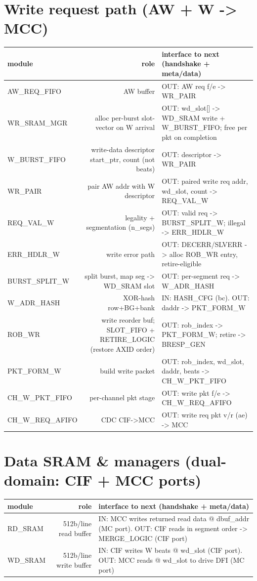 \documentclass[9pt]{extarticle}
\newenvironment{flow}{%
  \footnotesize\rowcolors{2}{white}{zeb}\begin{longtable}{M R I}
  \rowcolor{hb}\textbf{module} & \textbf{role} & \textbf{interface to next (handshake + meta/data)}\\ \midrule\endhead}
  {\bottomrule\end{longtable}}
\begin{document}
\section{Write request path  \textcolor{headbg}{(AW + W -> MCC)}}
\begin{flow}
AW_REQ_FIFO & AW buffer & OUT: AW req  f/e -> WR_PAIR\\
WR_SRAM_MGR & alloc per-burst slot-vector on W arrival & OUT: wd_slot[] -> WD_SRAM write + W_BURST_FIFO;  free per pkt on completion\\
W_BURST_FIFO & write-data descriptor {start_ptr, count} (not beats) & OUT: descriptor -> WR_PAIR\\
WR_PAIR & pair AW addr with W descriptor & OUT: paired write req {addr, wd_slot, count} -> REQ_VAL_W\\
REQ_VAL_W & legality + segmentation (n_segs) & OUT: valid req -> BURST_SPLIT_W;  illegal -> ERR_HDLR_W\\
ERR_HDLR_W & write error path & OUT: DECERR/SLVERR -> alloc ROB_WR entry, retire-eligible\\
BURST_SPLIT_W & split burst, map seg -> WD_SRAM slot & OUT: per-segment req -> W_ADR_HASH\\
W_ADR_HASH & XOR-hash row+BG+bank & IN: HASH_CFG (bc). OUT: daddr -> PKT_FORM_W\\
ROB_WR & write reorder buf; SLOT_FIFO + RETIRE_LOGIC (restore AXID order) & OUT: rob_index -> PKT_FORM_W;  retire -> BRESP_GEN\\
PKT_FORM_W & build write packet & OUT: {rob_index, wd_slot, daddr, beats} -> CH_W_PKT_FIFO\\
CH_W_PKT_FIFO & per-channel pkt stage & OUT: write pkt  f/e -> CH_W_REQ_AFIFO\\
CH_W_REQ_AFIFO & CDC CIF->MCC & OUT: write req pkt  v/r (ae) -> MCC\\
\end{flow}

\section{Data SRAM \& managers  \textcolor{headbg}{(dual-domain: CIF + MCC ports)}}
\begin{flow}
RD_SRAM & 512b/line read buffer & IN: MCC writes returned read data @ dbuf_addr (MC port). OUT: CIF reads in segment order -> MERGE_LOGIC (CIF port)\\
WD_SRAM & 512b/line write buffer & IN: CIF writes W beats @ wd_slot (CIF port). OUT: MCC reads @ wd_slot to drive DFI (MC port)\\
\end{flow}
\end{document}
